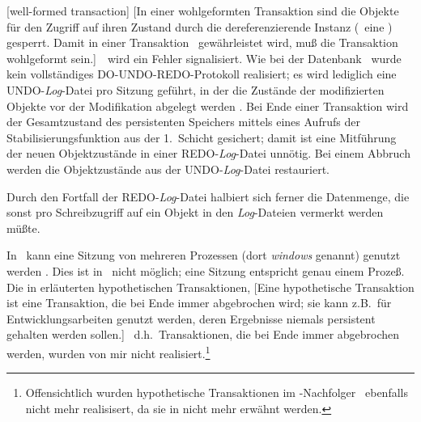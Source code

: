 %
[well-formed transaction]%
[{In einer wohlgeformten Transaktion sind die Objekte f\"{u}r den Zugriff
auf ihren Zustand durch die dereferenzierende Instanz
(\protect\ia\ eine \protect{}) gesperrt. Damit in einer
Transaktion \protect{}\ gew\"{a}hrleistet
wird, mu\ss{} die Transaktion wohlgeformt
sein.}]\ \cite[]{bib:gr93}\ wird
ein Fehler signalisiert. Wie bei der Datenbank \orion\ wurde kein
vollst\"{a}ndiges DO-UNDO-REDO-Protokoll \cite[]{bib:gr93}
realisiert; es wird lediglich eine UNDO-{\em Log\/}-Datei pro Sitzung
gef\"{u}hrt, in der die Zust\"{a}nde der modifizierten Objekte vor der
Modifikation abgelegt werden \cite[]{bib:ki89}
\cite[]{bib:it91}. Bei Ende einer Transaktion wird der
Gesamtzustand des persistenten Speichers mittels eines Aufrufs der
Stabilisierungsfunktion aus der 1.~Schicht gesichert; damit ist eine
Mitf\"{u}hrung der neuen Objektzust\"{a}nde in einer REDO-{\em Log\/}-Datei
unn\"{o}tig.  Bei einem Abbruch werden die Objektzust\"{a}nde aus der
UNDO-{\em Log\/}-Datei restauriert.
%
\par{}Durch den Fortfall der REDO-{\em Log\/}-Datei halbiert sich
ferner die Datenmenge, die sonst pro Schreibzugriff auf ein Objekt in
den {\em Log\/}-Dateien vermerkt werden m\"{u}\ss{}te.
%
\par{}In \orion\ kann eine Sitzung von mehreren Prozessen
(dort {\em windows\/} genannt) genutzt werden
\cite[]{bib:ki89} \cite[]{bib:it91}. Dies ist
in \plob\ nicht m\"{o}glich; eine Sitzung entspricht genau einem Proze\ss{}.
Die in \cite[]{bib:ki89} \cite[]{bib:ah91}
erl\"{a}uterten hypothetischen Transaktionen,%
%
[Eine hypothetische Transaktion ist eine Transaktion, die bei Ende
immer abgebrochen wird; sie kann z.B.\ f\"{u}r Entwicklungsarbeiten
genutzt werden, deren Ergebnisse niemals persistent gehalten werden
sollen.]%
\ d.h.\ Transaktionen, die
bei Ende immer abgebrochen werden, wurden von mir nicht
realisiert.\footnote{Offensichtlich wurden hypothetische
Transaktionen im \orion-Nachfolger \itasca\ ebenfalls nicht mehr
realisisert, da sie in \cite{bib:it91} nicht mehr erw\"{a}hnt werden.}
%

